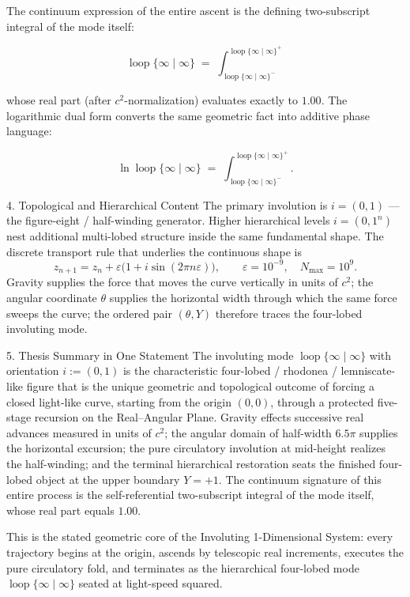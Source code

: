 The continuum expression of the entire ascent is the defining two-subscript integral of the mode itself:

\[
\operatorname{loop}\{\infty\mid\infty\}
\;=\;
\int_{\operatorname{loop}\{\infty\mid\infty\}^{-}}^{\operatorname{loop}\{\infty\mid\infty\}^{+}}
\]

whose real part (after \(c^2\)-normalization) evaluates exactly to \(1.00\). The logarithmic dual form converts the same geometric fact into additive phase language:

\[
\ln\operatorname{loop}\{\infty\mid\infty\}
\;=\;
\int_{\operatorname{loop}\{\infty\mid\infty\}^{-}}^{\operatorname{loop}\{\infty\mid\infty\}^{+}}.
\]

4. Topological and Hierarchical Content
The primary involution is \(i=(0,1)\) — the figure-eight / half-winding generator.
Higher hierarchical levels \(i=(0,1^n)\) nest additional multi-lobed structure inside the same fundamental shape.
The discrete transport rule that underlies the continuous shape is
  \[
  z_{n+1}=z_n+\varepsilon\bigl(1+i\sin(2\pi n\varepsilon)\bigr),\qquad\varepsilon=10^{-9},\quad N_{\max}=10^9.
  \]
Gravity supplies the force that moves the curve vertically in units of \(c^2\); the angular coordinate \(\theta\) supplies the horizontal width through which the same force sweeps the curve; the ordered pair \((\theta,Y)\) therefore traces the four-lobed involuting mode.

5. Thesis Summary in One Statement
The involuting mode \(\operatorname{loop}\{\infty\mid\infty\}\) with orientation \(i:=(0,1)\) is the characteristic four-lobed / rhodonea / lemniscate-like figure that is the unique geometric and topological outcome of forcing a closed light-like curve, starting from the origin \((0,0)\), through a protected five-stage recursion on the Real–Angular Plane. Gravity effects successive real advances measured in units of \(c^2\); the angular domain of half-width \(6.5\pi\) supplies the horizontal excursion; the pure circulatory involution at mid-height realizes the half-winding; and the terminal hierarchical restoration seats the finished four-lobed object at the upper boundary \(Y=+1\). The continuum signature of this entire process is the self-referential two-subscript integral of the mode itself, whose real part equals \(1.00\).

This is the stated geometric core of the Involuting 1-Dimensional System: every trajectory begins at the origin, ascends by telescopic real increments, executes the pure circulatory fold, and terminates as the hierarchical four-lobed mode \(\operatorname{loop}\{\infty\mid\infty\}\) seated at light-speed squared.

